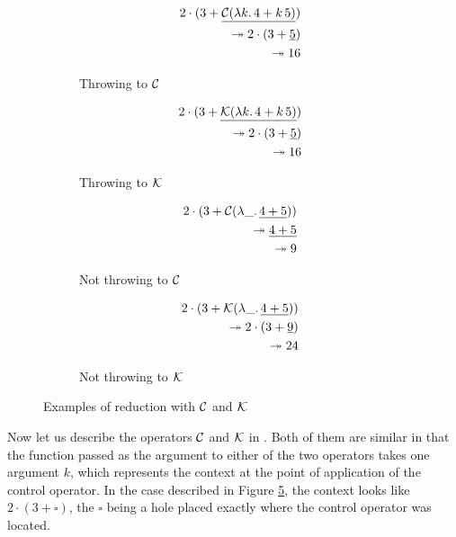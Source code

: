 \begin{figure}
\centering
\begin{subfigure}[t]{0.4\textwidth}
\begin{eqnarray*}
&&2 \cdot (3 + \underline{\mathcal{C}(\lambda k.\, 4 + k\, 5)}) \\
&&{} \twoheadrightarrow 2 \cdot (3 + \underline{5}) \\
&&{} \twoheadrightarrow 16
\end{eqnarray*}
\caption{Throwing to $\mathcal{C}$}\label{fig:CK-throwC}
\end{subfigure}
%
\begin{subfigure}[t]{0.4\textwidth}
\begin{eqnarray*}
&& 2 \cdot (3 + \underline{\mathcal{K}(\lambda k.\, 4 + k\, 5)}) \\
&& {} \twoheadrightarrow 2 \cdot (3 + \underline{5}) \\
&& {} \twoheadrightarrow 16
\end{eqnarray*}
\caption{Throwing to $\mathcal{K}$}\label{fig:CK-throwK}
\end{subfigure}

\begin{subfigure}[t]{0.4\textwidth}
\begin{eqnarray*}
&& 2 \cdot (3 + \mathcal{C}(\lambda \_.\, \underline{4 + 5})) \\
&& {} \twoheadrightarrow \underline{4 + 5} \\
&& {} \twoheadrightarrow 9
\end{eqnarray*}
\caption{Not throwing to $\mathcal{C}$}\label{fig:CK-nothrowC}
\end{subfigure}
%
\begin{subfigure}[t]{0.4\textwidth}
\begin{eqnarray*}
&& 2 \cdot (3 + \mathcal{K}(\lambda \_.\, \underline{4 + 5})) \\
&& {} \twoheadrightarrow 2 \cdot (3 + \underline{9}) \\
&& {} \twoheadrightarrow 24
\end{eqnarray*}
\caption{Not throwing to $\mathcal{K}$}\label{fig:CK-nothrowK}
\end{subfigure}

\caption{Examples of reduction with $\mathcal{C}$ and $\mathcal{K}$}
\label{fig:CK}
\end{figure}

Now let us describe the operators $\mathcal{C}$ and $\mathcal{K}$ in . Both of
them are similar in that the function passed
as the argument to either of the two operators takes one argument $k$, which represents
the context at the point of application of the control operator. In the case described
in Figure \ref{fig:CK}, the context
looks like $2 \cdot (3 + \square)$, the $\square$ being a hole placed exactly where
the control operator was located.

